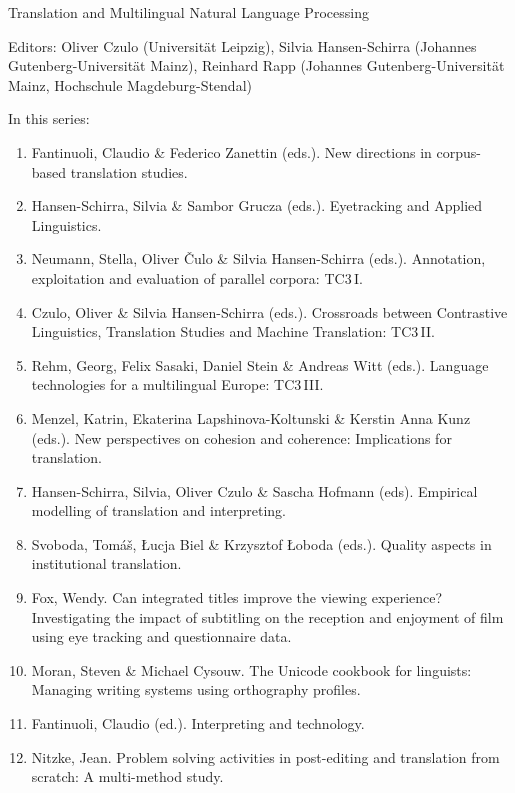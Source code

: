 {\large Translation and Multilingual Natural Language Processing}

\bigskip

Editors: Oliver Czulo (Universität Leipzig),
Silvia Hansen-Schirra (Johannes Gutenberg-Universität Mainz),
Reinhard Rapp (Johannes Gutenberg-Universität Mainz, Hochschule Magdeburg-Stendal)

\bigskip

In this series:

\begin{enumerate}
\item Fantinuoli, Claudio \& Federico Zanettin (eds.). New directions in corpus-based translation studies.
\item Hansen-Schirra, Silvia \& Sambor Grucza (eds.). Eyetracking and Applied Linguistics.
\item Neumann, Stella, Oliver Čulo \& Silvia Hansen-Schirra (eds.). Annotation, exploitation and evaluation of parallel corpora: TC3\,I.
\item Czulo, Oliver  \& Silvia Hansen-Schirra (eds.). Crossroads between Contrastive Linguistics, Translation Studies and Machine Translation: TC3\,II.
\item Rehm, Georg, Felix Sasaki, Daniel Stein \& Andreas Witt (eds.). Language technologies for a multilingual Europe: TC3\,III.
\item Menzel, Katrin, Ekaterina Lapshinova-Koltunski \& Kerstin Anna Kunz  (eds.). New perspectives on cohesion and coherence: Implications for translation.
\item Hansen-Schirra, Silvia, Oliver Czulo \& Sascha Hofmann (eds). Empirical modelling of translation and interpreting.
\item Svoboda, Tomáš, Łucja Biel \& Krzysztof Łoboda (eds.). Quality aspects in institutional translation.
\item Fox, Wendy. Can integrated titles improve the viewing experience? Investigating the impact of subtitling on the reception and enjoyment of film using eye tracking and questionnaire data.
\item Moran, Steven \& Michael Cysouw. The Unicode cookbook for linguists: Managing writing systems using orthography profiles.
\item Fantinuoli, Claudio (ed.). Interpreting and technology.
\item Nitzke, Jean. Problem solving activities in post-editing and translation from scratch: A multi-method study.
\end{enumerate}
